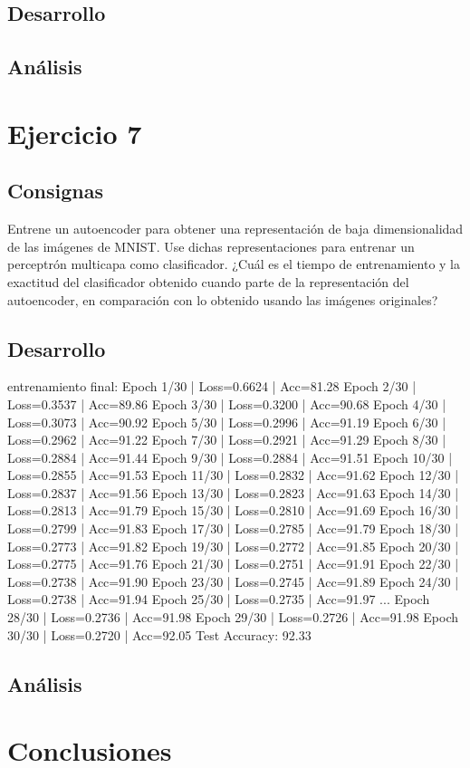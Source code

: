 \documentclass[11pt]{article} %
\begin{document}
\subsection{Desarrollo}

\subsection{Análisis}


\clearpage

\section{Ejercicio 7}

\subsection{Consignas}

Entrene un autoencoder para obtener una representación de baja dimensionalidad de las imágenes de MNIST. Use dichas representaciones para entrenar un perceptrón multicapa como clasificador. ¿Cuál es el tiempo de entrenamiento y la exactitud del clasificador obtenido cuando parte de la representación del autoencoder, en comparación con lo obtenido usando las imágenes originales?

\subsection{Desarrollo}



entrenamiento final:
Epoch 1/30 | Loss=0.6624 | Acc=81.28%
Epoch 2/30 | Loss=0.3537 | Acc=89.86%
Epoch 3/30 | Loss=0.3200 | Acc=90.68%
Epoch 4/30 | Loss=0.3073 | Acc=90.92%
Epoch 5/30 | Loss=0.2996 | Acc=91.19%
Epoch 6/30 | Loss=0.2962 | Acc=91.22%
Epoch 7/30 | Loss=0.2921 | Acc=91.29%
Epoch 8/30 | Loss=0.2884 | Acc=91.44%
Epoch 9/30 | Loss=0.2884 | Acc=91.51%
Epoch 10/30 | Loss=0.2855 | Acc=91.53%
Epoch 11/30 | Loss=0.2832 | Acc=91.62%
Epoch 12/30 | Loss=0.2837 | Acc=91.56%
Epoch 13/30 | Loss=0.2823 | Acc=91.63%
Epoch 14/30 | Loss=0.2813 | Acc=91.79%
Epoch 15/30 | Loss=0.2810 | Acc=91.69%
Epoch 16/30 | Loss=0.2799 | Acc=91.83%
Epoch 17/30 | Loss=0.2785 | Acc=91.79%
Epoch 18/30 | Loss=0.2773 | Acc=91.82%
Epoch 19/30 | Loss=0.2772 | Acc=91.85%
Epoch 20/30 | Loss=0.2775 | Acc=91.76%
Epoch 21/30 | Loss=0.2751 | Acc=91.91%
Epoch 22/30 | Loss=0.2738 | Acc=91.90%
Epoch 23/30 | Loss=0.2745 | Acc=91.89%
Epoch 24/30 | Loss=0.2738 | Acc=91.94%
Epoch 25/30 | Loss=0.2735 | Acc=91.97%
...
Epoch 28/30 | Loss=0.2736 | Acc=91.98%
Epoch 29/30 | Loss=0.2726 | Acc=91.98%
Epoch 30/30 | Loss=0.2720 | Acc=92.05%
Test Accuracy: 92.33%




\subsection{Análisis}

\clearpage


\section{Conclusiones}
\end{document}
